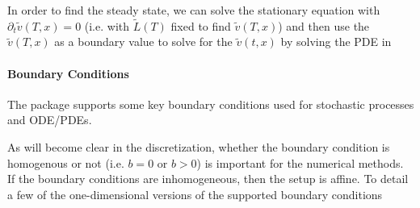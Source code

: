 \documentclass[11pt]{article}
\newcommand{\D}[1][]{\ensuremath{\partial_{#1}}}
\theoremstyle{definition}
\begin{document}
In order to find the steady state, we can solve the stationary equation with $\D[t] \tilde{v}(T, x) = 0$ (i.e. with $\tilde{L}(T)$ fixed to find $\tilde{v}(T,x)$) and then use the  $\tilde{v}(T,x)$ as a boundary value to solve for the $\tilde{v}(t,x)$ by solving the PDE in


\paragraph{Boundary Conditions}
The package supports some key boundary conditions used for stochastic processes and ODE/PDEs.

As will become clear in the discretization, whether the boundary condition is homogenous or not (i.e. $b = 0$ or $b>0$) is important for the numerical methods.  If the boundary conditions are inhomogeneous, then the setup is affine.  To detail a few of the one-dimensional versions of the supported boundary conditions
\end{document}
